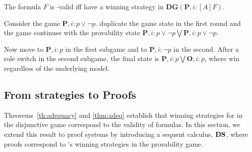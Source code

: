 \begin{corollary}
The formula $F $ is  \PNL-valid iff \Ic have a winning strategy in $\mathbf{DG}(\mathbf{P},i:[A]F )$.
\end{corollary}

\begin{example}
Consider  the game $\mathbf{P},i: p \vee \neg p$.
\Ic duplicate the game state in the first round and the
game continues with the provability state $\mathbf{P},i: p \vee \neg
p\bigvee \mathbf{P},i: p \vee \neg p$. 

Now \Ic move to $\mathbf{P},i: p$ in the
first subgame and to $\mathbf{P},i:\neg p$ in the second. After a role switch
in the second subgame, the final state is $\mathbf{P},i: p \bigvee
\mathbf{O},i: p$, where \Ic win regardless of the underlying model.
\end{example}

\subsection{From strategies to Proofs}\label{sec:proofs}

Theorems~\ref{th:adequacy} and \ref{thm:adeq} establish that winning strategies for \Me in the disjunctive game correspond to the validity of formulas. In this section, we extend this result to proof systems by introducing a sequent calculus, 
$\mathbf{DS}$, where proofs correspond to \My's winning strategies in the provability game.



